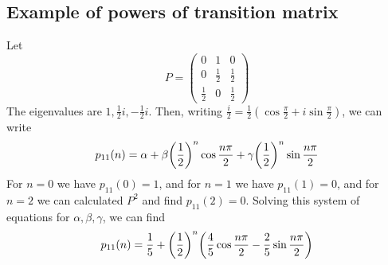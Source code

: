 \subsection{Example of powers of transition matrix}
\begin{example}
	Let
	\[
		P = \begin{pmatrix}
			0           & 1           & 0           \\
			0           & \frac{1}{2} & \frac{1}{2} \\
			\frac{1}{2} & 0           & \frac{1}{2}
		\end{pmatrix}
	\]
	The eigenvalues are \( 1, \frac{1}{2}i, -\frac{1}{2}i \).
	Then, writing \( \frac{i}{2} = \frac{1}{2} (\cos \frac{\pi}{2} + i \sin \frac{\pi}{2} ) \), we can write
	\[
		p_{11}(n) = \alpha + \beta \qty(\frac{1}{2})^n \cos \frac{n \pi}{2} + \gamma \qty(\frac{1}{2})^n \sin \frac{n \pi}{2}
	\]
	For \( n = 0 \) we have \( p_{11}(0) = 1 \), and for \( n = 1 \) we have \( p_{11}(1) = 0 \), and for \( n = 2 \) we can calculated \( P^2 \) and find \( p_{11}(2) = 0 \).
	Solving this system of equations for \( \alpha, \beta, \gamma \), we can find
	\[
		p_{11}(n) = \frac{1}{5} + \qty(\frac{1}{2})^n \qty(\frac{4}{5}\cos \frac{n \pi}{2} - \frac{2}{5}\sin \frac{n \pi}{2} )
	\]
\end{example}

